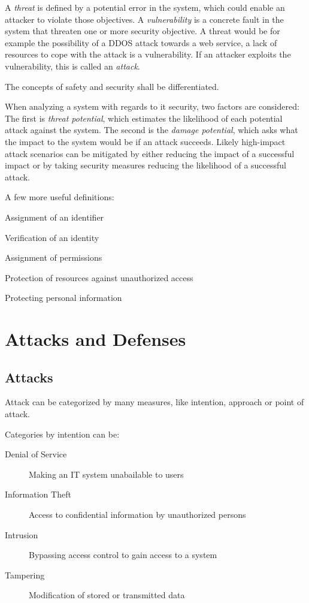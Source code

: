 A \emph{threat} is defined by a potential error in the system, which could
enable an attacker to violate those objectives. A \emph{vulnerability} is a
concrete fault in the system that threaten one or more security objective. A
threat would be for example the possibility of a DDOS attack towards a web
service, a lack of resources to cope with the attack is a vulnerability. If an
attacker exploits the vulnerability, this is called an \emph{attack}.

The concepts of safety and security shall be differentiated.

When analyzing a system with regards to it security, two factors are considered:
The first is \emph{threat potential}, which estimates the likelihood of each
potential attack against the system. The second is the \emph{damage potential},
which asks what the impact to the system would be if an attack succeeds. Likely
high-impact attack scenarios can be mitigated by either reducing the impact of a
successful impact or by taking security measures reducing the likelihood of a
successful attack.

A few more useful definitions:
\begin{description}[align=right,labelwidth=3cm]
    \item[Identification] Assignment of an identifier
    \item[Authentication] Verification of an identity
    \item[Authorization] Assignment of permissions
    \item[Access Control] Protection of resources against unauthorized access
    \item[Privacy] Protecting personal information
\end{description}

\section{Attacks and Defenses}
\subsection{Attacks}
Attack can be categorized by many measures, like intention, approach or point of
attack.

Categories by intention can be:
\begin{description}
    \item[Denial of Service ]Making an IT system unabailable to users
    \item[Information Theft] Access to confidential information by unauthorized
          persons
    \item[Intrusion] Bypassing access control to gain access to a system
    \item[Tampering] Modification of stored or transmitted data
\end{description}

